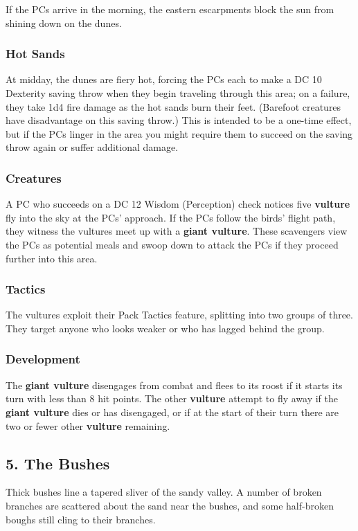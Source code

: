 \documentclass[10pt,a4paper,twoside,bg=print,twocolumn,openany,nodeprecatedcode]{dndbook}
\begin{document}
If the PCs arrive in the morning, the eastern escarpments block the sun from shining down on the dunes.

\subsubsection{Hot Sands}
At midday, the dunes are fiery hot, forcing the PCs each to make a DC 10 Dexterity saving throw when they begin traveling through this area; on a failure, they take 1d4 fire damage as the hot sands burn their feet. (Barefoot creatures have disadvantage on this saving throw.) This is intended to be a one-time effect, but if the PCs linger in the area you might require them to succeed on the saving throw again or suffer additional damage.

\subsubsection{Creatures}
A PC who succeeds on a DC 12 Wisdom (Perception) check notices five \textbf{vulture} fly into the sky at the PCs' approach. If the PCs follow the birds' flight path, they witness the vultures meet up with a \textbf{giant vulture}. These scavengers view the PCs as potential meals and swoop down to attack the PCs if they proceed further into this area.

\subsubsection{Tactics}
The vultures exploit their Pack Tactics feature, splitting into two groups of three. They target anyone who looks weaker or who has lagged behind the group.

\subsubsection{Development}
The \textbf{giant vulture} disengages from combat and flees to its roost if it starts its turn with less than 8 hit points. The other \textbf{vulture} attempt to fly away if the \textbf{giant vulture} dies or has disengaged, or if at the start of their turn there are two or fewer other \textbf{vulture} remaining.

\subsection{5. The Bushes}
\begin{DndReadAloud}{}
Thick bushes line a tapered sliver of the sandy valley. A number of broken branches are scattered about the sand near the bushes, and some half-broken boughs still cling to their branches.

\end{DndReadAloud}
\end{document}
